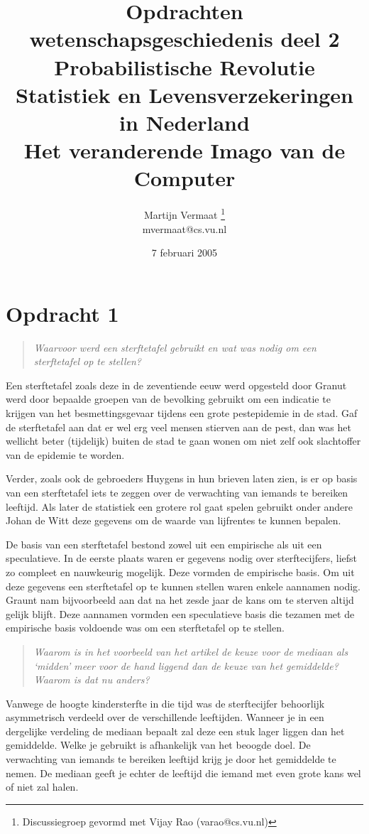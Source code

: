 \documentclass[a4paper,11pt]{article}
\title{Opdrachten wetenschapsgeschiedenis deel 2\\[0.6em]
\normalsize{Probabilistische Revolutie\\
Statistiek en Levensverzekeringen in Nederland\\
Het veranderende Imago van de Computer}}
\author{
    Martijn Vermaat
    \footnote{Discussiegroep gevormd met Vijay Rao (varao@cs.vu.nl)}\\
    mvermaat@cs.vu.nl
}
\date{7 februari 2005}
\begin{document}
\maketitle


\section*{Opdracht 1}


\begin{quote}
\emph{Waarvoor werd een sterftetafel gebruikt en wat was nodig om een
  sterftetafel op te stellen?}
\end{quote}


Een sterftetafel zoals deze in de zeventiende eeuw werd opgesteld door Granut
werd door bepaalde groepen van de bevolking gebruikt om een indicatie te
krijgen van het besmettingsgevaar tijdens een grote pestepidemie in de
stad. Gaf de sterftetafel aan dat er wel erg veel mensen stierven aan de pest,
dan was het wellicht beter (tijdelijk) buiten de stad te gaan wonen om niet
zelf ook slachtoffer van de epidemie te worden.

Verder, zoals ook de gebroeders Huygens in hun brieven laten zien, is er op
basis van een sterftetafel iets te zeggen over de verwachting van iemands te
bereiken leeftijd. Als later de statistiek een grotere rol gaat spelen
gebruikt onder andere Johan de Witt deze gegevens om de waarde van lijfrentes
te kunnen bepalen.

De basis van een sterftetafel bestond zowel uit een empirische als uit een
speculatieve. In de eerste plaats waren er gegevens nodig over sterftecijfers,
liefst zo compleet en nauwkeurig mogelijk. Deze vormden de empirische
basis. Om uit deze gegevens een sterftetafel op te kunnen stellen waren enkele
aannamen nodig. Graunt nam bijvoorbeeld aan dat na het zesde jaar de kans om
te sterven altijd gelijk blijft. Deze aannamen vormden een speculatieve basis
die tezamen met de empirische basis voldoende was om een sterftetafel op te
stellen.


\begin{quote}
\emph{Waarom is in het voorbeeld van het artikel de keuze voor de mediaan als
  `midden' meer voor de hand liggend dan de keuze van het gemiddelde? Waarom
  is dat nu anders?}
\end{quote}


Vanwege de hoogte kindersterfte in die tijd was de sterftecijfer behoorlijk
asymmetrisch verdeeld over de verschillende leeftijden. Wanneer je in een
dergelijke verdeling de mediaan bepaalt zal deze een stuk lager liggen dan het
gemiddelde. Welke je gebruikt is afhankelijk van het beoogde doel. De
verwachting van iemands te bereiken leeftijd krijg je door het gemiddelde te
nemen. De mediaan geeft je echter de leeftijd die iemand met even grote kans
wel of niet zal halen.
\end{document}
